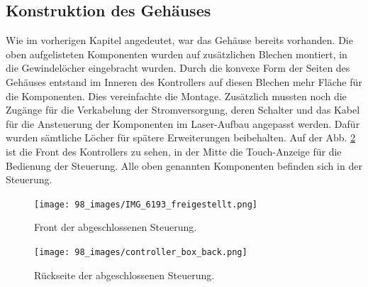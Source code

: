\subsection{Konstruktion des Gehäuses}
Wie im vorherigen Kapitel angedeutet, war das Gehäuse bereits vorhanden. Die oben aufgelisteten Komponenten wurden auf zusätzlichen Blechen montiert, in die Gewindelöcher eingebracht wurden. Durch die konvexe Form der Seiten des Gehäuses entstand im Inneren des Kontrollers auf diesen Blechen mehr Fläche für die Komponenten. Dies vereinfachte die Montage. Zusätzlich mussten noch die Zugänge für die Verkabelung der Stromversorgung, deren Schalter und das Kabel für die Ansteuerung der Komponenten im Laser-Aufbau angepasst werden. Dafür wurden sämtliche Löcher für spätere Erweiterungen beibehalten. Auf der Abb. \ref{fig:controller_free} ist die Front des Kontrollers zu sehen, in der Mitte die Touch-Anzeige für die Bedienung der Steuerung. Alle oben genannten Komponenten befinden sich in der Steuerung.

\begin{figure}[H]
    \centering
    \texttt{[image: 98\_images/IMG\_6193\_freigestellt.png]}
    \caption{Front der abgeschlossenen Steuerung.}
    \label{fig:controller_free}
\end{figure}

\begin{figure}[H]
    \centering
    \texttt{[image: 98\_images/controller\_box\_back.png]}
    \caption{Rückseite der abgeschlossenen Steuerung.}
    \label{fig:controller_free}
\end{figure}

\clearpage